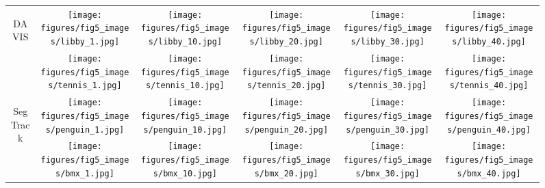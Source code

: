 \documentclass[10pt,twocolumn,letterpaper]{article}
\begin{document}
\begin{figure*}
\begin{centering}
\setlength{\tabcolsep}{1.5pt}
\begin{tabular}{cccccc}

\multirow{2}{*}{\begin{turn}{90}
{\footnotesize{}DAVIS}
\end{turn}} &
\texttt{[image: figures/fig5\_images/libby\_1.jpg]} &
\texttt{[image: figures/fig5\_images/libby\_10.jpg]} &
\texttt{[image: figures/fig5\_images/libby\_20.jpg]} &
\texttt{[image: figures/fig5\_images/libby\_30.jpg]} &
\texttt{[image: figures/fig5\_images/libby\_40.jpg]} \tabularnewline
 &
\texttt{[image: figures/fig5\_images/tennis\_1.jpg]} &
\texttt{[image: figures/fig5\_images/tennis\_10.jpg]} &
\texttt{[image: figures/fig5\_images/tennis\_20.jpg]} &
\texttt{[image: figures/fig5\_images/tennis\_30.jpg]} &
\texttt{[image: figures/fig5\_images/tennis\_40.jpg]} \tabularnewline
 \multirow{2}{*}{\begin{turn}{90}
{\footnotesize{}SegTrack}
\end{turn}}
 &
\texttt{[image: figures/fig5\_images/penguin\_1.jpg]} &
\texttt{[image: figures/fig5\_images/penguin\_10.jpg]} &
\texttt{[image: figures/fig5\_images/penguin\_20.jpg]} &
\texttt{[image: figures/fig5\_images/penguin\_30.jpg]} &
\texttt{[image: figures/fig5\_images/penguin\_40.jpg]} \tabularnewline
&
\texttt{[image: figures/fig5\_images/bmx\_1.jpg]} &
\texttt{[image: figures/fig5\_images/bmx\_10.jpg]} &
\texttt{[image: figures/fig5\_images/bmx\_20.jpg]} &
\texttt{[image: figures/fig5\_images/bmx\_30.jpg]} &
\texttt{[image: figures/fig5\_images/bmx\_40.jpg]} \tabularnewline


\end{tabular}
\end{centering}
\end{figure*}
\end{document}
